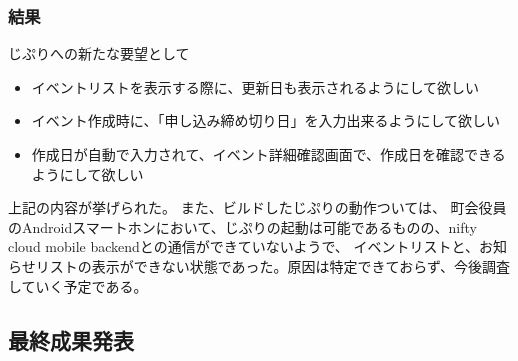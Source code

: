 \subsubsection{結果}
じぷりへの新たな要望として
\begin{itemize}
    \item イベントリストを表示する際に、更新日も表示されるようにして欲しい
    \item イベント作成時に、「申し込み締め切り日」を入力出来るようにして欲しい
    \item 作成日が自動で入力されて、イベント詳細確認画面で、作成日を確認できるようにして欲しい
\end{itemize}
上記の内容が挙げられた。
また、ビルドしたじぷりの動作ついては、
町会役員のAndroidスマートホンにおいて、じぷりの起動は可能であるものの、nifty cloud mobile backendとの通信ができていないようで、
イベントリストと、お知らせリストの表示ができない状態であった。原因は特定できておらず、今後調査していく予定である。

\subsection{最終成果発表}
